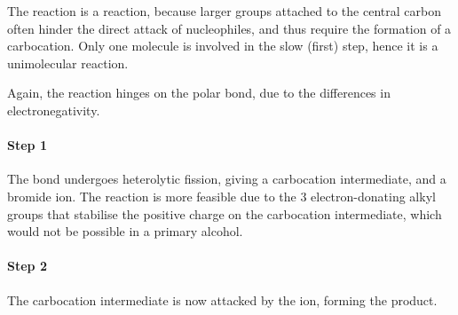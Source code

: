 			The \snone{} reaction is a  reaction, because larger groups attached to the central carbon
			often hinder the direct attack of nucleophiles, and thus require the formation of a carbocation. Only one molecule
			is involved in the slow (first) step, hence it is a unimolecular reaction.

			Again, the reaction hinges on the polar  bond, due to the differences in electronegativity.

			\paragraph{Step 1}


			The  bond undergoes heterolytic fission, giving a carbocation intermediate, and a bromide ion. The reaction is more
			feasible due to the 3 electron-donating alkyl groups that stabilise the positive charge on the carbocation intermediate, which
			would not be possible in a primary alcohol.

			\paragraph{Step 2}


			The carbocation intermediate is now attacked by the  ion, forming the product.


